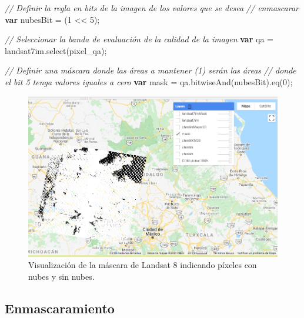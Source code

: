 \documentclass[
  12pt,
  letterpaper,
  twoside]{book}
\newenvironment{Shaded}{\begin{snugshade}}{\end{snugshade}}
\newcommand{\CommentTok}[1]{\textcolor[rgb]{0.24,0.58,0.00}{\textit{#1}}}
\newcommand{\DecValTok}[1]{\textcolor[rgb]{0.28,0.53,0.93}{#1}}
\newcommand{\FunctionTok}[1]{\textcolor[rgb]{0.48,0.12,0.64}{#1}}
\newcommand{\KeywordTok}[1]{\textcolor[rgb]{0.00,0.00,0.00}{\textbf{#1}}}
\newcommand{\NormalTok}[1]{#1}
\newcommand{\OperatorTok}[1]{\textcolor[rgb]{0.00,0.00,0.00}{#1}}
\newcommand{\StringTok}[1]{\textcolor[rgb]{0.87,0.29,0.22}{#1}}
\begin{document}
\begin{Shaded}
\begin{Highlighting}[]
\CommentTok{// Definir la regla en bits de la imagen de los valores que se desea }
\CommentTok{// enmascarar}
\KeywordTok{var}\NormalTok{ nubesBit }\OperatorTok{=}\NormalTok{ (}\DecValTok{1} \OperatorTok{\textless{}\textless{}} \DecValTok{5}\NormalTok{)}\OperatorTok{;}

\CommentTok{// Seleccionar la banda de evaluación de la calidad de la imagen}
\KeywordTok{var}\NormalTok{ qa }\OperatorTok{=}\NormalTok{ landsat7im}\OperatorTok{.}\FunctionTok{select}\NormalTok{(}\StringTok{\textquotesingle{}pixel\_qa\textquotesingle{}}\NormalTok{)}\OperatorTok{;}

\CommentTok{// Definir una máscara donde las áreas a mantener (1) serán las áreas }
\CommentTok{// donde el bit 5 tenga valores iguales a cero}
\KeywordTok{var}\NormalTok{ mask }\OperatorTok{=}\NormalTok{ qa}\OperatorTok{.}\FunctionTok{bitwiseAnd}\NormalTok{(nubesBit)}\OperatorTok{.}\FunctionTok{eq}\NormalTok{(}\DecValTok{0}\NormalTok{)}\OperatorTok{;}
\end{Highlighting}
\end{Shaded}

\begin{figure}[H]

{\centering \includegraphics[width=0.95\linewidth]{Img/ej278} 

}

\caption{Visualización de la máscara de Landsat 8 indicando píxeles con nubes y sin nubes.}\label{fig:unnamed-chunk-75}
\end{figure}

\hypertarget{enmascaramiento}{%
\subsection*{Enmascaramiento}\label{enmascaramiento}}
\end{document}
